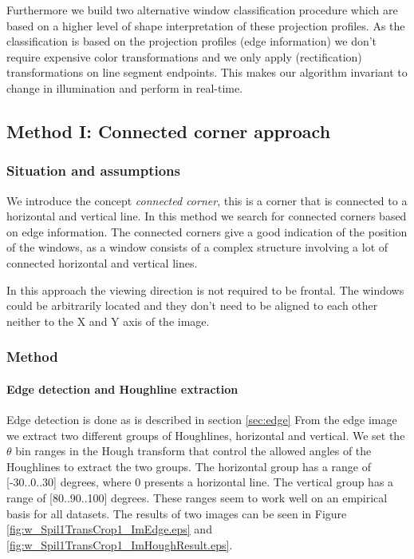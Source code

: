 Furthermore we build two alternative window classification procedure which are 
based on a higher level of shape interpretation of these projection profiles.
As the classification is based on the projection profiles (edge information) we
don't require expensive color transformations and we only apply (rectification)
transformations on line segment endpoints. This makes our algorithm invariant to
change in illumination and perform in real-time.  
	










\subsection{Method I: Connected corner approach} 
\subsubsection{Situation and assumptions}
We introduce the concept \emph{connected corner}, this is a corner that is 
connected to a horizontal and vertical line.  
In this method we search for connected corners based on edge information.
The connected corners give a good indication of the position of the windows, as 
a window consists of a complex structure involving a lot of connected horizontal
and vertical lines. 

In this approach the viewing direction is not required to be frontal.
The windows could be arbitrarily located and they don't need
to be aligned to each other neither to the X and Y axis of the image.

\subsubsection{Method}
\paragraph{Edge detection and Houghline extraction}
Edge detection is done as is described in section 
\ref{sec:edge}
From the edge image we extract two different groups of Houghlines, horizontal and 
vertical.  We set the $\theta$ bin ranges in the Hough transform that control the
allowed angles of the Houghlines to extract the two groups. The horizontal group
has a range of [-30..0..30] degrees, where 0 presents a horizontal line. The vertical
group has a range of [80..90..100] degrees. These ranges seem
to work well on an empirical basis for all datasets.
The results of two images can be seen in Figure \ref{fig:w_Spil1TransCrop1_ImEdge.eps} and
 \ref{fig:w_Spil1TransCrop1_ImHoughResult.eps}.

